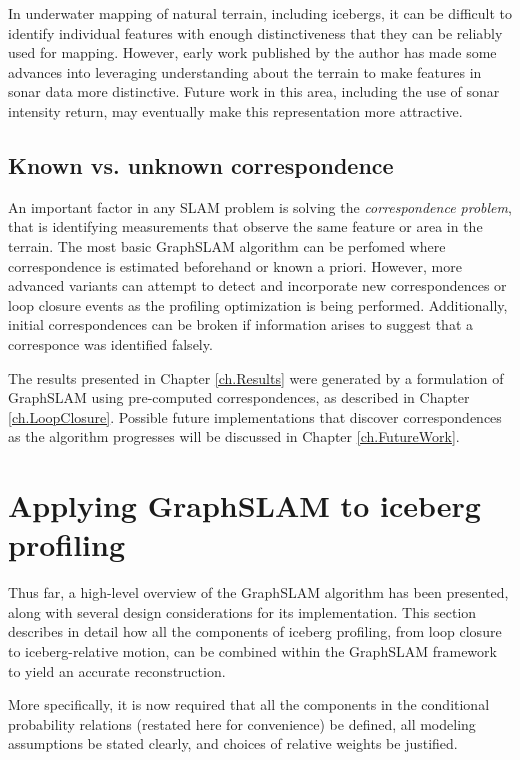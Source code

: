 In underwater mapping of natural terrain, including icebergs, it can be difficult to identify individual features with enough distinctiveness that they can be reliably used for mapping. However, early work published by the author has made some advances into leveraging understanding about the terrain to make features in sonar data more distinctive. \cite{me!} Future work in this area, including the use of sonar intensity return, may eventually make this representation more attractive.


\subsection{Known vs. unknown correspondence}

An important factor in any SLAM problem is solving the \emph{correspondence problem}, that is identifying measurements that observe the same feature or area in the terrain. The most basic GraphSLAM algorithm can be perfomed where correspondence is estimated beforehand or known a priori. However, more advanced variants can attempt to detect and incorporate new correspondences or loop closure events as the profiling optimization is being performed. Additionally, initial correspondences can be broken if information arises to suggest that a corresponce was identified falsely. 

The results presented in Chapter \ref{ch.Results} were generated by a formulation of GraphSLAM using pre-computed correspondences, as described in Chapter \ref{ch.LoopClosure}. Possible future implementations that discover correspondences as the algorithm progresses will be discussed in Chapter \ref{ch.FutureWork}.

\section{Applying GraphSLAM to iceberg profiling}

Thus far, a high-level overview of the GraphSLAM algorithm has been presented, along with several design considerations for its implementation. This section describes in detail how all the components of iceberg profiling, from loop closure to iceberg-relative motion, can be combined within the GraphSLAM framework to  yield an accurate reconstruction. 

More specifically, it is now required that all the components in the conditional probability relations (restated here for convenience) be defined, all modeling assumptions be stated clearly, and choices of relative weights be justified. 

